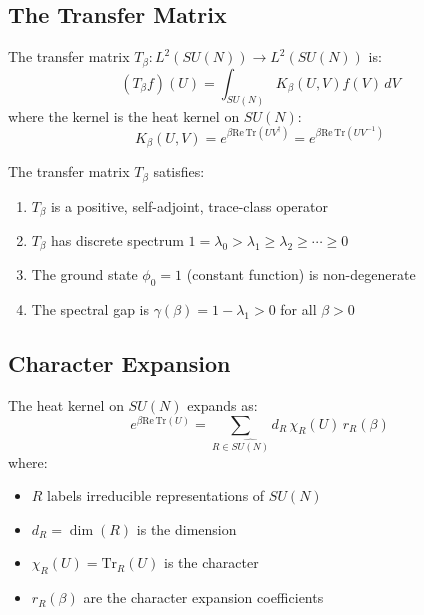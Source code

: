 \subsection{The Transfer Matrix}

\begin{definition}
\label{def:transfer-matrix}
The transfer matrix $T_\beta : L^2(SU(N)) \to L^2(SU(N))$ is:
\begin{equation}
(T_\beta f)(U) = \int_{SU(N)} K_\beta(U, V) f(V) \, dV
\end{equation}
where the kernel is the heat kernel on $SU(N)$:
\begin{equation}
K_\beta(U, V) = e^{\beta \mathrm{Re}\,\mathrm{Tr}(UV^\dagger)} = e^{\beta \mathrm{Re}\,\mathrm{Tr}(UV^{-1})}
\end{equation}
\end{definition}

\begin{theorem}
\label{thm:transfer-props}
The transfer matrix $T_\beta$ satisfies:
\begin{enumerate}
\item $T_\beta$ is a positive, self-adjoint, trace-class operator
\item $T_\beta$ has discrete spectrum $1 = \lambda_0 > \lambda_1 \geq \lambda_2 \geq \cdots \geq 0$
\item The ground state $\phi_0 = 1$ (constant function) is non-degenerate
\item The spectral gap is $\gamma(\beta) = 1 - \lambda_1 > 0$ for all $\beta > 0$
\end{enumerate}
\end{theorem}

\subsection{Character Expansion}

\begin{theorem}
\label{thm:character-expansion-117}
The heat kernel on $SU(N)$ expands as:
\begin{equation}
e^{\beta \mathrm{Re}\,\mathrm{Tr}(U)} = \sum_{R \in \widehat{SU(N)}} d_R \, \chi_R(U) \, r_R(\beta)
\end{equation}
where:
\begin{itemize}
\item $R$ labels irreducible representations of $SU(N)$
\item $d_R = \dim(R)$ is the dimension
\item $\chi_R(U) = \mathrm{Tr}_R(U)$ is the character
\item $r_R(\beta)$ are the character expansion coefficients
\end{itemize}
\end{theorem}

